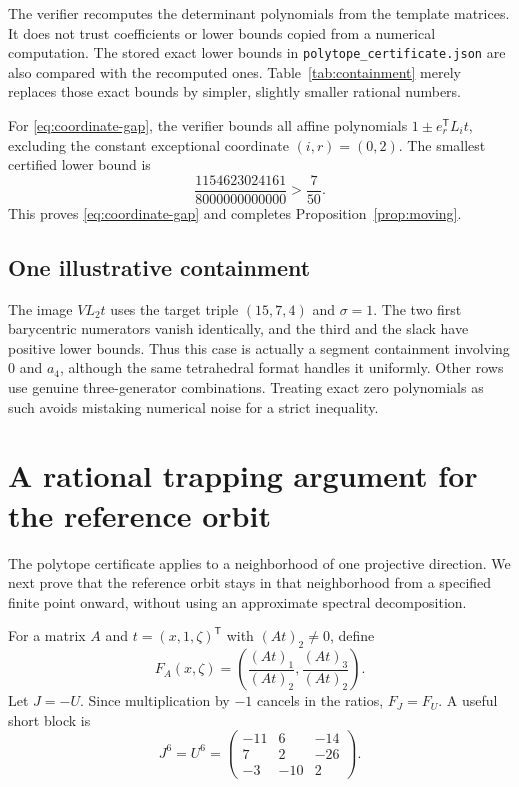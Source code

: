 \documentclass[11pt,a4paper]{article}
\theoremstyle{definition}\newtheorem{definition}[theorem]{Definition}
\theoremstyle{remark}\newtheorem{remark}[theorem]{Remark}
\newcommand{\tr}{\mathsf T}
\begin{document}
The verifier recomputes the determinant polynomials from the template
matrices. It does not trust coefficients or lower bounds copied from a
numerical computation. The stored exact lower bounds in
\texttt{polytope\_certificate.json} are also compared with the recomputed ones.
Table~\ref{tab:containment} merely replaces those exact bounds by simpler,
slightly smaller rational numbers.

For \eqref{eq:coordinate-gap}, the verifier bounds all affine polynomials
$1\pm e_r^\tr L_it$, excluding the constant exceptional coordinate
$(i,r)=(0,2)$. The smallest certified lower bound is
\begin{equation}
 \frac{1154623024161}{8000000000000}>\frac7{50}.
 \label{eq:exact-gap}
\end{equation}
This proves \eqref{eq:coordinate-gap} and completes
Proposition~\ref{prop:moving}.

\subsection{One illustrative containment}
The image $VL_2t$ uses the target triple $(15,7,4)$ and $\sigma=1$.
The two first barycentric numerators vanish identically, and the third and
the slack have positive lower bounds. Thus this case is actually a segment
containment involving $0$ and $a_4$, although the same tetrahedral format
handles it uniformly. Other rows use genuine three-generator combinations.
Treating exact zero polynomials as such avoids mistaking numerical noise for
a strict inequality.

\section{A rational trapping argument for the reference orbit}
\label{sec:trap}

The polytope certificate applies to a neighborhood of one projective
direction. We next prove that the reference orbit stays in that neighborhood
from a specified finite point onward, without using an approximate spectral
decomposition.

For a matrix $A$ and $t=(x,1,\zeta)^\tr$ with $(At)_2\ne0$, define
\begin{equation}
 F_A(x,\zeta)=\left(\frac{(At)_1}{(At)_2},
                         \frac{(At)_3}{(At)_2}\right).
 \label{eq:projective}
\end{equation}
Let $J=-U$. Since multiplication by $-1$ cancels in the ratios,
$F_J=F_U$. A useful short block is
\begin{equation}
 J^6=U^6=\begin{pmatrix}-11&6&-14\\7&2&-26\\-3&-10&2\end{pmatrix}.
 \label{eq:six}
\end{equation}
\end{document}
